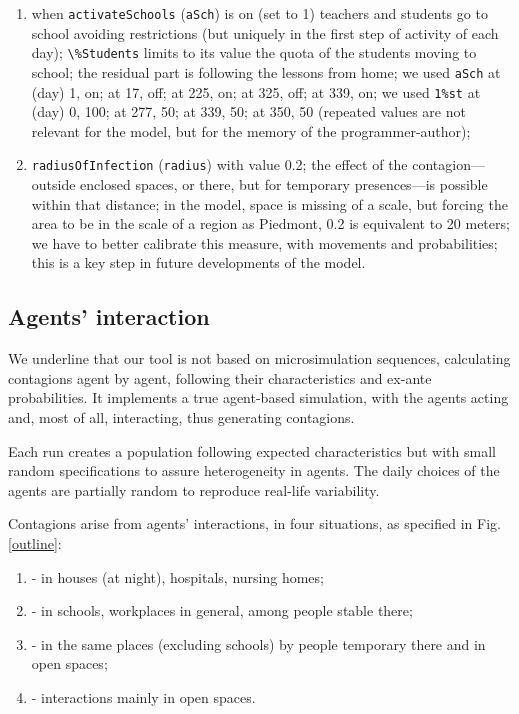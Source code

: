 \documentclass[graybox]{svmult}
\begin{document}
\begin{enumerate}[label=\roman*]
\item \label{p7} when \verb|activateSchools| (\verb|aSch|) is on (set to 1) teachers and students go to school avoiding restrictions (but uniquely in the first step of activity of each day);  \verb|\%Students| limits to its value the quota of the students moving to school; the residual part is following the lessons from home; we used \verb|aSch| at (day) 1, on; at 17, off; at 225, on; at 325, off; at 339, on; we used \verb|1%st| 
at (day) 0, 100; at 277, 50; at 339, 50; at 350, 50 (repeated values are not relevant for the model, but for the memory of the programmer-author);

\item \label{p8} \verb|radiusOfInfection| (\verb|radius|) with value 0.2; the effect of the contagion---outside enclosed spaces, or there, but for temporary presences---is possible within that distance; in the model, space is missing of a scale, but forcing the area to be in the scale of a region as Piedmont, 0.2 is equivalent to 20 meters; we have to better calibrate this measure, with movements and probabilities; this is a key step in future developments of the model.

\end{enumerate}

\subsection{Agents' interaction}
\label{inter}

We underline that our tool is not based on microsimulation sequences, calculating contagions agent by agent, following their characteristics and ex-ante probabilities. It implements a true agent-based simulation, with the agents acting and, most of all, interacting, thus generating contagions.

Each run creates a population following expected characteristics but with small random specifications to assure heterogeneity in agents. The daily choices of the agents are partially random to reproduce real-life variability.

Contagions arise from agents' interactions, in four situations, as specified in Fig. \ref{outline}:

\begin{enumerate}[label=\Alph*]

\item - in houses (at night), hospitals, nursing homes;

\item - in schools, workplaces in general, among people stable there;

\item - in the same places (excluding schools) by people temporary there and in open spaces;

\item - interactions mainly in open spaces.

\end{enumerate}
\end{document}
